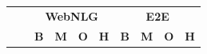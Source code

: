 \begin{table}[t]

    \centering \small
    \begin{tabular}{llcccccccc} \toprule
                                                                                     &                  & \multicolumn{4}{c}{\textbf{WebNLG}} & \multicolumn{4}{c}{\textbf{E2E}}                                                                                                       \\
                                                                                     &                  & \textbf{B}                          & \textbf{M}                       & \textbf{O}     & \textbf{H}     & \textbf{B}     & \textbf{M}     & \textbf{O}     & \textbf{H}     \\\midrule


\end{tabular}
\end{table}
